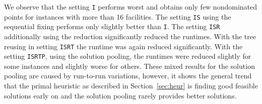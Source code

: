 \documentclass{article}
\begin{document}
We observe that the setting \texttt{I} performs worst and obtains only few nondominated points for instances with more than 16 facilities. The setting \texttt{IS} using the sequential fixing performs only slightly better than \texttt{I}. The setting \texttt{ISR} additionally using the reduction significantly reduced the runtimes. With the tree reusing in setting \texttt{ISRT} the runtime was again reduced significantly. With the setting \texttt{ISRTP}, using the solution pooling, the runtimes were reduced slightly for some instances and slightly worse for others. These mixed results for the solution pooling are caused by run-to-run variations, however, it shows the general trend that the primal heuristic as described in Section~\ref{sec:heur} is finding good feasible solutions early on and the solution pooling rarely provides better solutions.
\end{document}

